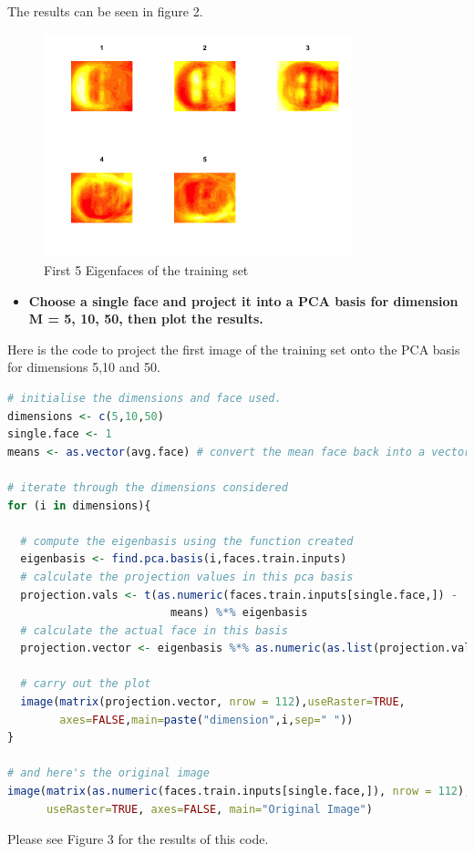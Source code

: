\documentclass[12pt]{article}
\begin{document}
The results can be seen in figure 2.

\begin{figure}
\caption{First 5 Eigenfaces of the  training set}
\centering
\includegraphics[width=0.8\textwidth]{eigenface}
\end{figure}


\begin{itemize}
\item \textbf{Choose a single face and project it into a PCA basis for dimension M = 5, 10, 50, then plot the results.}
\end{itemize}

Here is the code to project the first image of the training set onto the PCA basis for dimensions 5,10 and 50.
\newpage 
\begin{lstlisting}[linewidth=18.4cm,language=R]
# initialise the dimensions and face used.
dimensions <- c(5,10,50)
single.face <- 1
means <- as.vector(avg.face) # convert the mean face back into a vector

# iterate through the dimensions considered
for (i in dimensions){
  
  # compute the eigenbasis using the function created
  eigenbasis <- find.pca.basis(i,faces.train.inputs)
  # calculate the projection values in this pca basis
  projection.vals <- t(as.numeric(faces.train.inputs[single.face,]) - 
                         means) %*% eigenbasis
  # calculate the actual face in this basis
  projection.vector <- eigenbasis %*% as.numeric(as.list(projection.vals))
  
  # carry out the plot
  image(matrix(projection.vector, nrow = 112),useRaster=TRUE, 
        axes=FALSE,main=paste("dimension",i,sep=" "))
}

# and here's the original image
image(matrix(as.numeric(faces.train.inputs[single.face,]), nrow = 112), 
      useRaster=TRUE, axes=FALSE, main="Original Image")
\end{lstlisting}
Please see Figure 3 for the results of this code.
\end{document}

